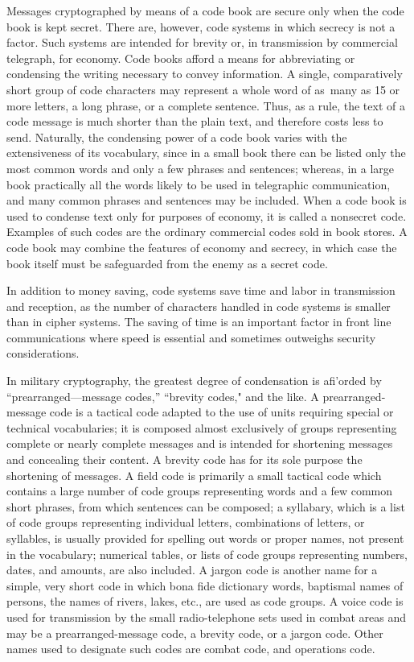 \mypara Messages cryptographed by means of a code book are secure only
when the code book is kept secret. There are, however, code systems in
which secrecy is not a factor. Such systems are intended for brevity or,
in transmission by commercial telegraph, for economy. Code books
afford a means for abbreviating or condensing the writing necessary to
convey information. A single, comparatively short group of code characters may represent a whole word of as~many as 15 or more letters, a
long phrase, or a complete sentence. Thus, as a rule, the text of a code
message is much shorter than the plain text, and therefore costs less to
send. Naturally, the condensing power of a code book varies with the extensiveness of its vocabulary, since in a small book there can be listed
only the most common words and only a few phrases and sentences;
whereas, in a large book practically all the words likely to be used in telegraphic communication, and many common phrases and sentences may
be included. When a code book is used to condense text only for purposes of economy, it is called a nonsecret code. Examples of such codes
are the ordinary commercial codes sold in book stores. A code book may
combine the features of economy and secrecy, in which case the book
itself must be safeguarded from the enemy as a secret code.

\mypara In addition to money saving, code systems save time and labor in
transmission and reception, as the number of characters handled in code
systems is smaller than in cipher systems. The saving of time is an
important factor in front line communications where speed is essential
and sometimes outweighs security considerations.

\mypara In military cryptography, the greatest degree of condensation is
aﬁ'orded by “prearranged—message codes,” “brevity codes," and the like.
A prearranged-message code is a tactical code adapted to the use of units
requiring special or technical vocabularies; it is composed almost exclusively of groups representing complete or nearly complete messages
and is intended for shortening messages and concealing their content.
A brevity code has for its sole purpose the shortening of messages. A
ﬁeld code is primarily a small tactical code which contains a large number
of code groups representing words and a few common short phrases,
from which sentences can be composed; a syllabary, which is a list of
code groups representing individual letters, combinations of letters, or
syllables, is usually provided for spelling out words or proper names, not
present in the vocabulary; numerical tables, or lists of code groups representing numbers, dates, and amounts, are also included. A jargon code
is another name for a simple, very short code in which bona ﬁde dictionary words, baptismal names of persons, the names of rivers, lakes, etc.,
are used as code groups. A voice code is used for transmission by the
small radio-telephone sets used in combat areas and may be a prearranged-message code, a brevity code, or a jargon code. Other names used
to designate such codes are combat code, and operations code.

